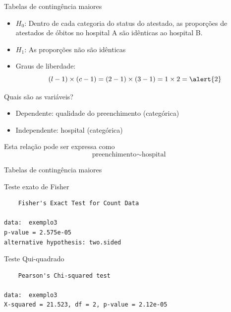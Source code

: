 \documentclass{beamer}
\begin{document}
\begin{frame}{\scriptsize Tabelas de contingência maiores}
  \begin{itemize}
    \footnotesize
  \item $H_0$: Dentro de cada categoria do status do atestado, as
    proporções de atestados de óbitos no hospital A são idênticas ao
    hospital B.
  \item $H_1$: As proporções não são idênticas
  \item Graus de liberdade:
    \begin{displaymath}
      (l -1)\times (c-1) = (2-1) \times (3-1)
      = 1 \times 2 = \alert{2}
    \end{displaymath}
  \end{itemize}
\end{frame}

\begin{frame}{\scriptsize Quais são as variáveis?}
  \begin{itemize}
    \footnotesize
  \item Dependente: qualidade do preenchimento (categórica)
  \item Independente: hospital (categórica)
  \end{itemize}
  \vfill
  \begin{block}{Esta relação pode ser expressa como}
    \begin{displaymath}
      \text{preenchimento} \sim \text{hospital}
    \end{displaymath}
  \end{block}
\end{frame}

\begin{frame}[fragile]{\scriptsize Tabelas de contingência maiores}
  \begin{exampleblock}{Teste exato de Fisher}
    \scriptsize
\begin{verbatim}
	Fisher's Exact Test for Count Data

data:  exemplo3
p-value = 2.575e-05
alternative hypothesis: two.sided
\end{verbatim}

  \end{exampleblock}
  \begin{exampleblock}{Teste Qui-quadrado}
    \scriptsize
\begin{verbatim}
	Pearson's Chi-squared test

data:  exemplo3
X-squared = 21.523, df = 2, p-value = 2.12e-05
\end{verbatim}
  \end{exampleblock}
\end{frame}
\end{document}
